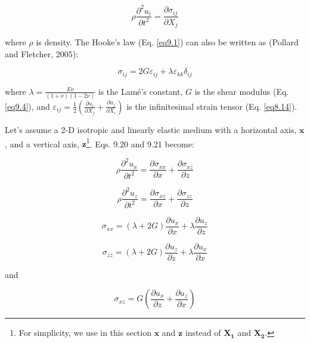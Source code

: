 \documentclass[a4paper , 12pt]{book}
\begin{document}
\begin{equation}
    \rho\frac{\partial^2 u_i}{\partial t^2} = \frac{\partial \sigma_{ij}}{\partial X_j}
\end{equation}

where $\rho$ is density. The Hooke's law (Eq. \ref{eq9.1}) can also be written as (Pollard and Fletcher, 2005):

\begin{equation}
    \sigma_{ij}= 2G \varepsilon_{ij} + \lambda \varepsilon_{kk}\delta_{ij}
\end{equation}

where $\lambda = \frac{E\nu}{(1 + \nu)(1-2\nu)}$ is the Lam\' e's constant, $G$ is the shear modulus (Eq. \ref{eq9.4}), and $\varepsilon_{ij} = \frac{1}{2}\left(\frac{\partial u_i}{\partial X_j}+\frac{\partial u_j}{\partial X_i}\right)$ is the infinitesimal strain tensor (Eq. \ref{eq8.14}).

Let's assume a 2-D isotropic and linearly elastic medium with a horizontal axis, $\mathbf{x}$, and a vertical axis, $\mathbf{z}$\footnote{For simplicity, we use in this section $\mathbf{x}$ and $\mathbf{z}$ instead of $\mathbf{X_1}$ and $\mathbf{X_2}$.}. Eqs. 9.20 and 9.21 become:

\begin{equation}
    \rho\frac{\partial^2u_x}{\partial t^2}=\frac{\partial\sigma_{xx}}{\partial x}+\frac{\partial\sigma_{xz}}{\partial z}
\end{equation}

\begin{equation}
    \rho\frac{\partial^2u_z}{\partial t^2}=\frac{\partial\sigma_{xz}}{\partial x}+\frac{\partial\sigma_{zz}}{\partial z}
\end{equation}

\begin{equation}
    \sigma_{xx}=\left(\lambda+2G\right)\frac{\partial u_x}{\partial x}+\lambda\frac{\partial u_z}{\partial z}
\end{equation}

\begin{equation}
    \sigma_{zz}=\left(\lambda+2G\right)\frac{\partial u_z}{\partial z}+\lambda\frac{\partial u_x}{\partial x}
\end{equation}

and

\begin{equation}
    \sigma_{xz}=G\left(\frac{\partial u_x}{\partial z}+\frac{\partial u_z}{\partial x}\right)
\end{equation}
\end{document}
